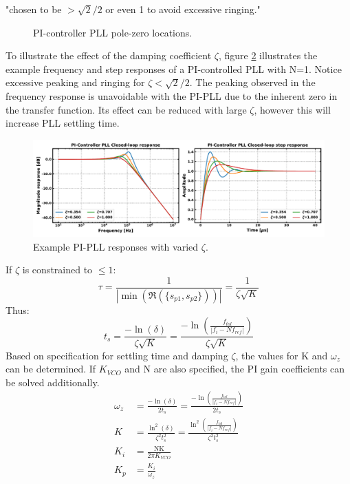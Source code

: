 			"chosen to be $>\sqrt{2}/2$ or even 1 to avoid excessive ringing."
			\begin{figure}[htb!]
				\center
				\caption{PI-controller PLL pole-zero locations.}
				\label{fig:pi_pll_pz}
			\end{figure}
			\FloatBarrier
			To illustrate the effect of the damping coefficient $\zeta$, figure \ref{fig:pi_pll_response} illustrates the example frequency and step responses of a PI-controlled PLL with N=1. Notice excessive peaking and ringing for $\zeta<\sqrt{2}/2$. The peaking observed in the frequency response is unavoidable with the PI-PLL due to the inherent zero in the transfer function. Its effect can be reduced with large $\zeta$, however this will increase PLL settling time. 
			\begin{figure}[htb!]
				\center\includegraphics[width=1.0\textwidth, angle=0]{figs/pi_pll_response.pdf}
				\caption{Example PI-PLL responses with varied $\zeta$.}
				\label{fig:pi_pll_response}
			\end{figure}
			\FloatBarrier
			If $\zeta$ is constrained to $\leq 1$:
			\begin{equation}
				\tau = \frac{1}{|\min(\Re(\{s_{p1}, s_{p2}\}))|} = \frac{1}{\zeta\sqrt{K}}
			\end{equation}
			Thus:
			\begin{equation}
				t_s = \frac{-\ln(\delta)}{\zeta\sqrt{K}} = \frac{-\ln\left(\frac{f_{tol}}{|f_i - Nf_{ref}|}\right)}{\zeta\sqrt{K}} 
			\end{equation}
			Based on specification for settling time and damping $\zeta$, the values for K and $\omega_z$ can be determined. If $K_{VCO}$ and $\mathrm{N}$ are also specified, the PI gain coefficients can be solved additionally.
			\begin{align}
				\omega_z &= \frac{-\ln(\delta)}{2t_s} =  \frac{-\ln\left(\frac{f_{tol}}{|f_i - Nf_{ref}|}\right)}{2t_s}\\
				K &= \frac{\ln^2(\delta)}{\zeta^2t_s^2} =  \frac{\ln^2\left(\frac{f_{tol}}{|f_i - Nf_{ref}|}\right)}{\zeta^2t_s^2}\\
				K_i & = \frac{\mathrm{N}\mathrm{K}}{2\pi K_{VCO}} \\
				K_p & = \frac{K_i}{\omega_z}
			\end{align}


